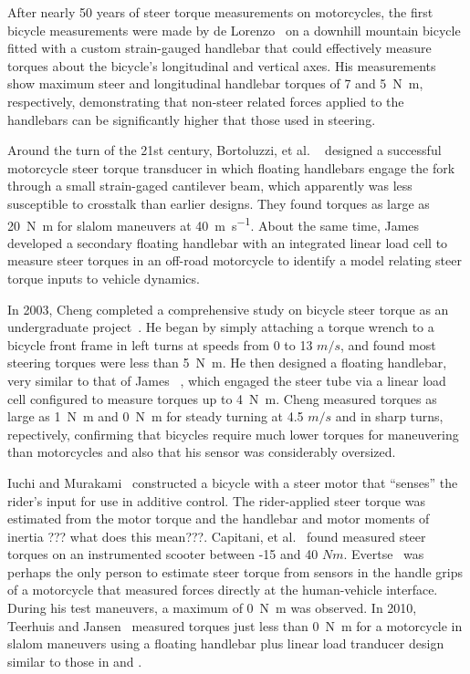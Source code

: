\documentclass[10pt]{article}
\begin{document}
After nearly 50 years of steer torque measurements on motorcycles, the first
bicycle measurements were made by de Lorenzo~\cite{Lorenzo1997} on a downhill
mountain bicycle fitted with a custom strain-gauged handlebar that could
effectively measure torques about the bicycle's longitudinal and vertical axes.
His measurements show maximum steer and longitudinal handlebar torques of 7 and
\SI{5}{\newton\meter}, respectively, demonstrating that non-steer related forces applied to the
handlebars can be significantly higher that those used in steering.

Around the turn of the 21st century, Bortoluzzi, et al. ~\cite{Bortoluzzi2000}
designed a successful motorcycle steer torque transducer in which floating
handlebars engage the fork through a small strain-gaged cantilever beam, which
apparently was less susceptible to crosstalk than earlier designs. They found
torques as large as \SI{20}{\newton\meter} for slalom maneuvers at \SI{40}{\meter\per\second}.
About the same time, James~\cite{James2002} developed a secondary floating
handlebar with an integrated linear load cell to measure steer torques in an
off-road motorcycle to identify a model relating steer torque inputs to vehicle
dynamics.

In 2003, Cheng completed a comprehensive study on bicycle steer torque as an
undergraduate project~\cite{Cheng2003}. He began by simply attaching a torque
wrench to a bicycle front frame in left turns at speeds from 0 to 13 $m/s$, and
found most steering torques were less than \SI{5}{\newton\meter}. He then designed a floating
handlebar, very similar to that of James~\cite{James2002} , which engaged the
steer tube via a linear load cell configured to measure torques up to \SI{4}{\newton\meter}.
Cheng measured torques as large as \SI{1}{\newton\meter} and \SI{0}{\newton\meter} for steady turning at 4.5
$m/s$ and in sharp turns, repectively, confirming that bicycles require much
lower torques for maneuvering than motorcycles and also that his sensor was
considerably oversized.

Iuchi and Murakami~\cite{Iuchi2006} constructed a bicycle with a steer motor
that ``senses'' the rider's input for use in additive control. The
rider-applied steer torque was estimated from the motor torque and the
handlebar and motor moments of inertia ??? what does this mean???. Capitani, et
al.~\cite{Capitani2006} found measured steer torques on an instrumented scooter
between -15 and 40 $Nm$. Evertse~\cite{Evertse2010} was perhaps the only person
to estimate steer torque from sensors in the handle grips of a motorcycle that
measured forces directly at the human-vehicle interface. During his test
maneuvers, a maximum of \SI{0}{\newton\meter} was observed. In 2010, Teerhuis and
Jansen~\cite{Teerhuis2010}  measured torques just less than \SI{0}{\newton\meter} for a
motorcycle in slalom maneuvers using a floating handlebar plus linear load
tranducer design similar to those in \cite{James2002} and \cite{Cheng2003}.
\end{document}
